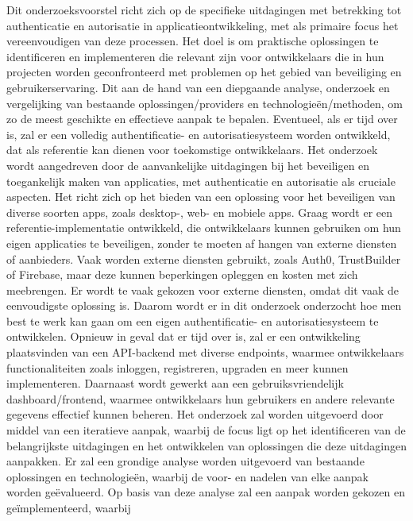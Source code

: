 Dit onderzoeksvoorstel richt zich op de specifieke uitdagingen met betrekking tot authenticatie en autorisatie in applicatieontwikkeling, met als primaire 
focus het vereenvoudigen van deze processen. Het doel is om praktische oplossingen te identificeren en implementeren die relevant zijn voor ontwikkelaars 
die in hun projecten worden geconfronteerd met problemen op het gebied van beveiliging en gebruikerservaring. Dit aan de hand van een diepgaande analyse,
onderzoek en vergelijking van bestaande oplossingen/providers en technologieën/methoden, om zo de meest geschikte en effectieve aanpak te bepalen. Eventueel,
als er tijd over is, zal er een volledig authentificatie- en autorisatiesysteem worden ontwikkeld, dat als referentie kan dienen voor toekomstige
ontwikkelaars.
\newline
\newline
Het onderzoek wordt aangedreven door de aanvankelijke uitdagingen bij het beveiligen en toegankelijk maken van applicaties, met authenticatie en 
autorisatie als cruciale aspecten. Het richt zich op het bieden van een oplossing voor het beveiligen van diverse soorten apps, zoals desktop-, 
web- en mobiele apps. Graag wordt er een referentie-implementatie ontwikkeld, die ontwikkelaars kunnen gebruiken om hun eigen applicaties te beveiligen,
zonder te moeten af hangen van externe diensten of aanbieders. Vaak worden externe diensten gebruikt, zoals Auth0, TrustBuilder of Firebase, maar deze
kunnen beperkingen opleggen en kosten met zich meebrengen. Er wordt te vaak gekozen voor externe diensten, omdat dit vaak de eenvoudigste oplossing is.
Daarom wordt er in dit onderzoek onderzocht hoe men best te werk kan gaan om een eigen authentificatie- en autorisatiesysteem te ontwikkelen.
Opnieuw in geval dat er tijd over is, zal er een ontwikkeling plaatsvinden van een API-backend met diverse endpoints, waarmee ontwikkelaars functionaliteiten 
zoals inloggen, registreren, upgraden en meer kunnen implementeren. Daarnaast wordt gewerkt aan een gebruiksvriendelijk dashboard/frontend, waarmee 
ontwikkelaars hun gebruikers en andere relevante gegevens effectief kunnen beheren. 
\newline
\newline
Het onderzoek zal worden uitgevoerd door middel van een iteratieve aanpak, waarbij de focus ligt op het identificeren van de belangrijkste uitdagingen
en het ontwikkelen van oplossingen die deze uitdagingen aanpakken. Er zal een grondige analyse worden uitgevoerd van bestaande oplossingen en technologieën,
waarbij de voor- en nadelen van elke aanpak worden geëvalueerd. Op basis van deze analyse zal een aanpak worden gekozen en geïmplementeerd, waarbij
